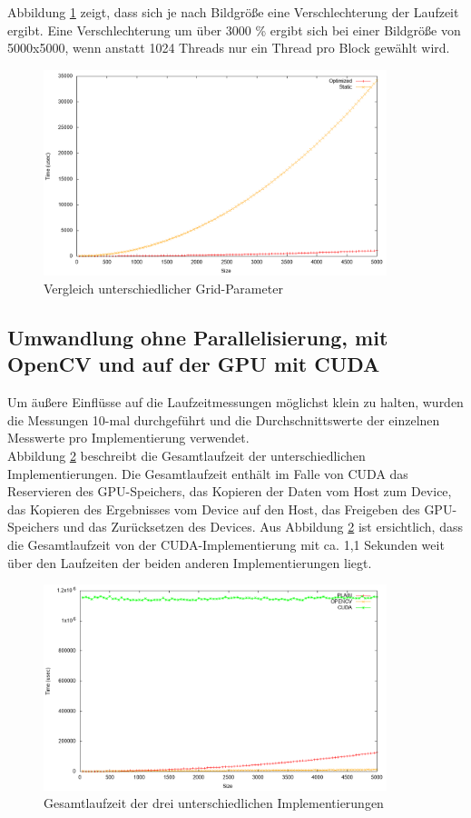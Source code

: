 \documentclass{llncs}
\begin{document}
Abbildung \ref{fig:analysis_grids} zeigt, dass sich je nach Bildgröße eine Verschlechterung der Laufzeit ergibt. Eine Verschlechterung um über 3000 \% ergibt sich bei einer Bildgröße von 5000x5000, wenn anstatt 1024 Threads nur ein Thread pro Block gewählt wird.

\begin{figure}
	\centering
	\includegraphics[width=10cm,keepaspectratio]{analysis_grids.png}
	\caption{Vergleich unterschiedlicher Grid-Parameter}
	\label{fig:analysis_grids}
\end{figure}


%
\subsection{Umwandlung ohne Parallelisierung, mit OpenCV und auf der GPU mit CUDA}
%

Um äußere Einflüsse auf die Laufzeitmessungen möglichst klein zu halten, wurden die Messungen 10-mal durchgeführt und die Durchschnittswerte der einzelnen Messwerte pro Implementierung verwendet.\\

Abbildung \ref{fig:analysis} beschreibt die Gesamtlaufzeit der unterschiedlichen Implementierungen. Die Gesamtlaufzeit enthält im Falle von CUDA das Reservieren des GPU-Speichers, das Kopieren der Daten vom Host zum Device, das Kopieren des Ergebnisses vom Device auf den Host, das Freigeben des GPU-Speichers und das Zurücksetzen des Devices. Aus Abbildung \ref{fig:analysis} ist ersichtlich, dass die Gesamtlaufzeit von der CUDA-Implementierung mit ca. 1,1 Sekunden weit über den Laufzeiten der beiden anderen Implementierungen liegt.

\begin{figure}
	\centering
	\includegraphics[width=10cm,keepaspectratio]{analysis.png}
	\caption{Gesamtlaufzeit der drei unterschiedlichen Implementierungen}
	\label{fig:analysis}
\end{figure}
\end{document}
